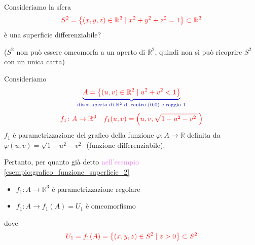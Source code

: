         \begin{esempio}
        Consideriamo la sfera 
        \[ \color{red} S^2 = \left\{ (x,y,z) \in \mathbb{R}^3 \mid x^2 + y^2 + z^2 = 1 \right\} \subset \mathbb{R}^3 \]
        è una superficie differenziabile?

        \textcolor{blu}{($S^2$ non può essere omeomorfa a un aperto di $\mathbb{R}^2$, quindi non si può ricoprire $S^2$ con un unica carta)}

        Consideriamo
        \[ \color{blu} \underbrace{\textcolor{red}{A=\left\{ \left(u,v\right) \in \mathbb{R}^2 \mid u^2 + v^2 < 1 \right\}}}_{\text{disco aperto di } \mathbb{R}^2 \text{ di centro } (0,0) \text{ e raggio } 1}\]
        \[ \color{red} f_1 \colon A \to \mathbb{R}^3 \quad f_1(u,v)= \left(u,v, \sqrt{1-u^2-v^2 \,} \,\right) \]
        $f_1$ è parametrizzazione del grafico della funzione $\varphi \colon A \to \mathbb{R}$ definita da $\varphi(u,v) = \sqrt{1-u^2-v^2 \,}$ \textcolor{blu}{(funzione differenziabile)}.

        Pertanto, per quanto già detto \textcolor{violet}{nell'esempio \ref{esempio:grafico_funzione_superficie_2}} 
        \begin{itemize}
            \item $f_1 \colon A \to \mathbb{R}^3$ è parametrizzazione regolare 
            \item $f_1 \colon A \to f_1(A)=U_1$ è omeomorfismo 
        \end{itemize}
        dove 
        \[ \color{red} U_1 = f_1(A) = \left\{ (x,y,z) \in S^2 \mid z > 0 \right\} \subset S^2 \]
        \begin{center}
\end{center}
\end{esempio}
